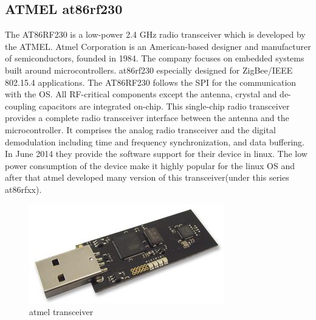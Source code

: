 \subsection{ATMEL at86rf230}
The AT86RF230 is a low-power 2.4 GHz radio transceiver which is developed by the ATMEL. Atmel Corporation is an American-based designer and manufacturer of semiconductors, founded in 1984. The company focuses on embedded systems built around microcontrollers. at86rf230 especially designed for ZigBee/IEEE 802.15.4 applications. The AT86RF230 follows the SPI for the communication with the OS. All RF-critical components except the antenna, crystal and de-coupling capacitors are integrated on-chip. This single-chip radio transceiver provides a complete radio transceiver interface between the antenna and the microcontroller. It comprises the analog radio transceiver and the digital demodulation including time and frequency synchronization, and data buffering. In June 2014 they provide the software support for their device in linux. The low power consumption of the device make it highly popular for the linux OS and after that atmel developed many version of this transceiver(under this series at86rfxx).
\begin{figure}[ht]
	\centering
	\includegraphics[scale=1]{images/atmel.jpg}
	\caption{atmel transceiver}
\end{figure}
